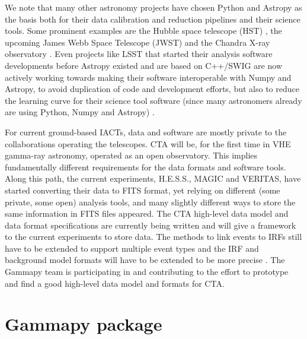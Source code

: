 \documentclass{PoS}
\begin{document}
We note that many other astronomy projects have chosen Python and Astropy as the
basis both for their data calibration and reduction pipelines and their science
tools. Some prominent examples are the Hubble space telescope (HST)
\cite{hubble}, the upcoming James Webb Space Telescope (JWST) \cite{jwst} and
the Chandra X-ray observatory \cite{sherpa2001, chandra}. Even projects like
LSST that started their analysis software developments before Astropy existed
and are based on C++/SWIG are now actively working towards making their software
interoperable with Numpy and Astropy, to avoid duplication of code and
development efforts, but also to reduce the learning curve for their science
tool software (since many astronomers already are using Python, Numpy and
Astropy) \cite{lsst}.

For current ground-based IACTs, data and software are mostly private to the
collaborations operating the telescopes. CTA will be, for the first time in VHE
gamma-ray astronomy, operated as an open observatory. This implies fundamentally
different requirements for the data formats and software tools. Along this path,
the current experiments, H.E.S.S., MAGIC and VERITAS, have started converting
their data to FITS format, yet relying on different (some private, some open)
analysis tools, and many slightly different ways to store the same information
in FITS files appeared. The CTA high-level data model and data format
specifications  are currently being written and will give a framework to the
current experiments to store data. The methods to link events to IRFs still have
to be extended to  support multiple event types and the IRF and background model
formats will have to be  extended to be more precise \cite{opendata}. The
Gammapy team is participating  in and contributing to the effort to prototype
and find a good high-level data  model and formats for CTA.

\section{Gammapy package}
\label{sec:package}
\end{document}

